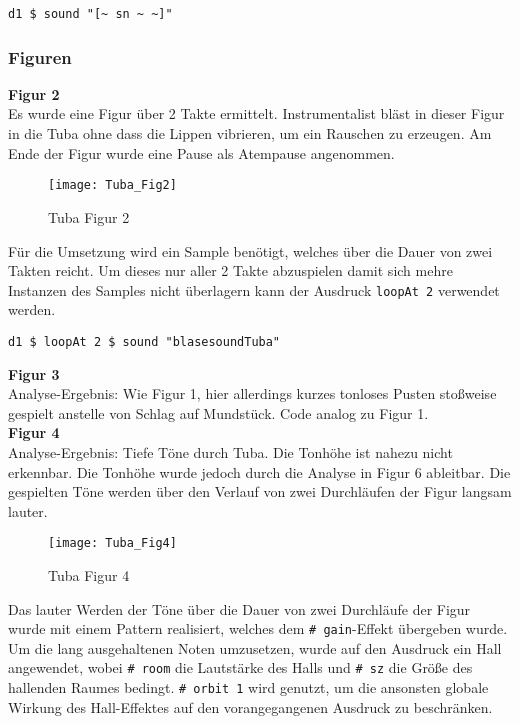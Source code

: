 \documentclass[
10pt, %
a4paper, %
oneside, %
headinclude,footinclude, %
BCOR5mm, %
]{scrartcl}
\begin{document}
\begin{lstlisting}
d1 $ sound "[~ sn ~ ~]"
\end{lstlisting}

\subsubsection{Figuren}
\textbf{Figur 2}\\
Es wurde eine Figur über 2 Takte ermittelt. Instrumentalist bläst in dieser Figur in die Tuba ohne dass die Lippen vibrieren, um ein Rauschen zu erzeugen. Am Ende der Figur wurde eine Pause als Atempause angenommen. 

\begin{figure}[h]
	\centering 
	\texttt{[image: Tuba\_Fig2]} 
	\caption{Tuba Figur 2}
\end{figure}

\noindent Für die Umsetzung wird ein Sample benötigt, welches über die Dauer von zwei Takten reicht. Um dieses nur aller 2 Takte abzuspielen damit sich mehre Instanzen des Samples nicht überlagern kann der Ausdruck \verb|loopAt 2| \cite{tid9} verwendet werden.
\begin{lstlisting}
d1 $ loopAt 2 $ sound "blasesoundTuba"
\end{lstlisting}

\noindent\textbf{Figur 3}\\
Analyse-Ergebnis: Wie Figur 1, hier allerdings kurzes tonloses Pusten stoßweise gespielt anstelle von Schlag auf Mundstück. Code analog zu Figur 1.\\

\noindent\textbf{Figur 4}\\
Analyse-Ergebnis: Tiefe Töne durch Tuba. Die Tonhöhe ist nahezu nicht erkennbar. Die Tonhöhe wurde jedoch durch die Analyse in Figur 6 ableitbar. Die gespielten Töne werden über den Verlauf von zwei Durchläufen der Figur langsam lauter.\\

\begin{figure}[h]
	\centering 
	\texttt{[image: Tuba\_Fig4]} 
	\caption{Tuba Figur 4}
\end{figure}

\noindent Das lauter Werden der Töne über die Dauer von zwei Durchläufe der Figur wurde mit einem Pattern realisiert, welches dem \verb|# gain|-Effekt übergeben wurde.\cite{tid10} Um die lang ausgehaltenen Noten umzusetzen, wurde auf den Ausdruck ein Hall angewendet, wobei \verb|# room| die Lautstärke des Halls und \verb|# sz| die Größe des hallenden Raumes bedingt. \verb|# orbit 1| wird genutzt, um die ansonsten globale Wirkung des Hall-Effektes auf den vorangegangenen Ausdruck zu beschränken. \cite{tid11} 
\end{document}
